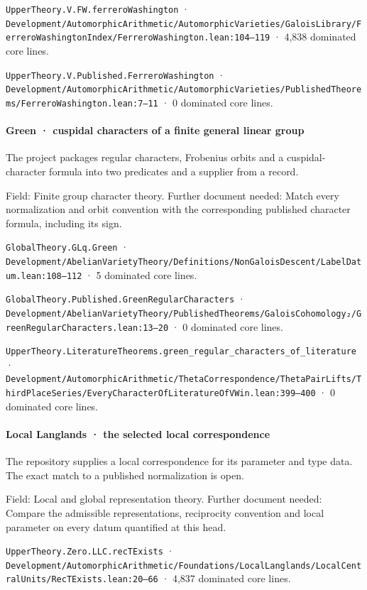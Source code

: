 \nolinkurl{UpperTheory.V.FW.ferreroWashington} · \nolinkurl{Development/AutomorphicArithmetic/AutomorphicVarieties/GaloisLibrary/FerreroWashingtonIndex/FerreroWashington.lean:104–119} · 4,838 dominated core lines.

\nolinkurl{UpperTheory.V.Published.FerreroWashington} · \nolinkurl{Development/AutomorphicArithmetic/AutomorphicVarieties/PublishedTheorems/FerreroWashington.lean:7–11} · 0 dominated core lines.

\paragraph{Green · cuspidal characters of a finite general linear group}

The project packages regular characters, Frobenius orbits and a cuspidal-character formula into two predicates and a supplier from a record.

Field: Finite group character theory. Further document needed: Match every normalization and orbit convention with the corresponding published character formula, including its sign.

\nolinkurl{GlobalTheory.GLq.Green} · \nolinkurl{Development/AbelianVarietyTheory/Definitions/NonGaloisDescent/LabelDatum.lean:108–112} · 5 dominated core lines.

\nolinkurl{GlobalTheory.Published.GreenRegularCharacters} · \nolinkurl{Development/AbelianVarietyTheory/PublishedTheorems/GaloisCohomology₂/GreenRegularCharacters.lean:13–20} · 0 dominated core lines.

\nolinkurl{UpperTheory.LiteratureTheorems.green_regular_characters_of_literature} · \nolinkurl{Development/AutomorphicArithmetic/ThetaCorrespondence/ThetaPairLifts/ThirdPlaceSeries/EveryCharacterOfLiteratureOfVWin.lean:399–400} · 0 dominated core lines.

\paragraph{Local Langlands · the selected local correspondence}

The repository supplies a local correspondence for its parameter and type data. The exact match to a published normalization is open.

Field: Local and global representation theory. Further document needed: Compare the admissible representations, reciprocity convention and local parameter on every datum quantified at this head.

\nolinkurl{UpperTheory.Zero.LLC.recTExists} · \nolinkurl{Development/AutomorphicArithmetic/Foundations/LocalLanglands/LocalCentralUnits/RecTExists.lean:20–66} · 4,837 dominated core lines.

